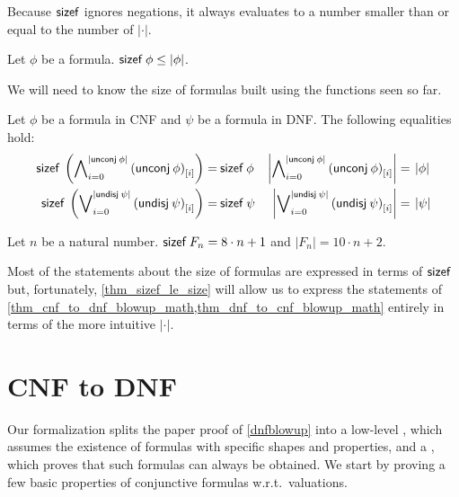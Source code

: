 \documentclass[a4paper,USenglish,cleveref, autoref, thm-restate]{lipics-v2021}
\theoremstyle{definition}
\begin{document}
Because $\mathsf{sizef}$ ignores negations, it always evaluates to a number smaller than or equal to the number of $\left|\cdot\right|$.

\begin{lemma}
  \label{thm_sizef_le_size}
  Let $\phi$ be a formula.
  $\mathsf{sizef} \> \phi \le \left|\phi\right|$.
\end{lemma}

We will need to know the size of formulas built using the functions seen so far.

\begin{lemma}
  \label{thm_sizef_BigOr_undnf_BigAnd_unconj}
	Let $\phi$ be a formula in CNF and $\psi$ be a formula in DNF.
  The following equalities hold:
  \begin{align*}
    \mathsf{sizef} \> \left(\bigwedge\nolimits_{i = 0}\nolimits^{\left|\mathsf{unconj} \> \phi\right|} {(\mathsf{unconj} \> \phi)}_{[i]}\right) =\:& \mathsf{sizef} \> \phi &
    \left|\bigwedge\nolimits_{i = 0}\nolimits^{\left|\mathsf{unconj} \> \phi\right|} {(\mathsf{unconj} \> \phi)}_{[i]}\right| =\:& \left|\phi\right|
    \\
    \mathsf{sizef} \> \left(\bigvee\nolimits_{i = 0}\nolimits^{\left|\mathsf{undisj} \> \psi\right|} {(\mathsf{undisj} \> \psi)}_{[i]}\right) =\:& \mathsf{sizef} \> \psi &
    \left|\bigvee\nolimits_{i = 0}\nolimits^{\left|\mathsf{undisj} \> \psi\right|} {(\mathsf{undisj} \> \psi)}_{[i]}\right| =\:& \left|\psi\right|
  \end{align*}
\end{lemma}

\begin{lemma}
  \label{thm_sizef_Fn}
  Let $n$ be a natural number.
  $\mathsf{sizef} \> F_n = 8 \cdot n + 1$ and
  $\left|F_n\right| = 10 \cdot n + 2$.
\end{lemma}

Most of the statements about the size of formulas are expressed in terms of $\mathsf{sizef}$ but, fortunately, \cref{thm_sizef_le_size} will allow us to express the statements of \cref{thm_cnf_to_dnf_blowup_math,thm_dnf_to_cnf_blowup_math} entirely in terms of the more intuitive $\left|\cdot\right|$.


\section{CNF to DNF}
\label{sec_CNF_to_DNF}

Our formalization splits the paper proof of \cref{dnfblowup} into a low-level , which assumes the existence of formulas with specific shapes and properties, and a , which proves that such formulas can always be obtained.
We start by proving a few basic properties of conjunctive formulas w.r.t.\ valuations.
\end{document}
